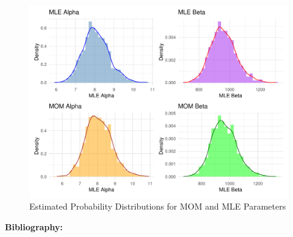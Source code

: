 \documentclass{article}\usepackage[]{graphicx}\usepackage[]{xcolor}
\begin{document}
\begin{multicols}{2}
\begin{figure}[H]
\includegraphics[scale=0.4]{ptestgraph.pdf}
\caption{Estimated Probability Distributions for MOM and MLE Parameters}
\label{fig2}
\end{figure}


\vspace{2em}

\noindent\textbf{Bibliography:}


\begin{tiny}

\end{tiny}
\end{multicols}
\end{document}
